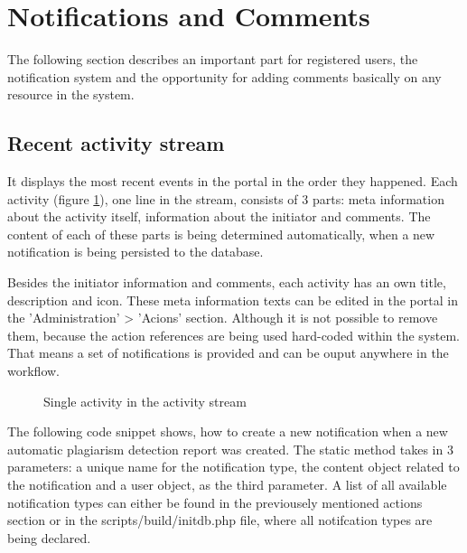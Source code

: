 \section{Notifications and Comments}

The following section describes an important part for registered users, the notification system and the opportunity for adding comments basically on any resource in the system.

\subsection{Recent activity stream}
It displays the most recent events in the portal in the order they happened. Each activity (figure \ref{fig:activity-stream-single-activity}), one line in the stream, consists of 3 parts: meta information about the activity itself, information about the initiator and comments. The content of each of these parts is being determined automatically, when a new notification is being persisted to the database.

Besides the initiator information and comments, each activity has an own title, description and icon. These meta information texts can be edited in the portal in the 'Administration' > 'Acions' section. Although it is not possible to remove them, because the action references are being used hard-coded within the system. That means a set of notifications is provided and can be ouput anywhere in the workflow.

\begin{figure}[!h]
  \centering
  \caption{Single activity in the activity stream}
  \label{fig:activity-stream-single-activity}
\end{figure}

The following code snippet shows, how to create a new notification when a new automatic plagiarism detection report was created. The static method takes in 3 parameters: a unique name for the notification type, the content object related to the notification and a user object, as the third parameter. A list of all available notification types can either be found in the previousely mentioned actions section or in the scripts/build/initdb.php file, where all notifcation types are being declared.

